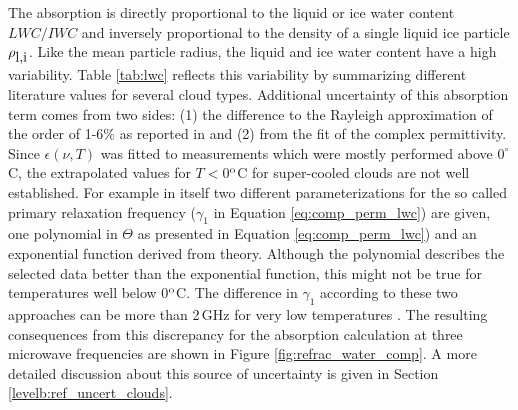 %
The absorption is directly proportional to the liquid or ice water
content $LWC/IWC$ and inversely proportional to the density of a
single liquid ice particle $\rho_{\mbox{\rm l,i}}$. Like the mean particle radius,
the liquid and ice water content have a high variability. Table
\ref{tab:lwc} reflects this variability by summarizing different
literature values for several cloud types. Additional uncertainty 
of this absorption term comes from two sides: 
(1) the difference to the Rayleigh approximation
of the order of 1-6\% as reported in \citet{lietal:97} and (2) from
the fit of the complex permittivity.  Since $\epsilon(\nu,T)$ was
fitted to measurements which were mostly performed above $0^\circ$C,
the extrapolated values for $T<$0$^{\rm o}$C for super-cooled
clouds are not well established. For example in \cite{liebeetal:91} 
itself two different parameterizations for the so called primary 
relaxation frequency ($\gamma_1$ in Equation \ref{eq:comp_perm_lwc}) 
are given, one polynomial in $\Theta$ as presented in 
Equation \ref{eq:comp_perm_lwc}) and an exponential function derived
from theory. Although the polynomial describes the selected 
data better than the exponential function, this might not be true for
temperatures well below 0$^{\rm o}$C.
The difference in $\gamma_1$ according to these two approaches can 
be more than 2\,GHz for very low temperatures \citep{liptonetal:99}. 
The resulting consequences from this discrepancy for the absorption 
calculation at three microwave frequencies are shown in 
Figure \ref{fig:refrac_water_comp}. A more detailed
discussion about this source of uncertainty is given in Section
\ref{levelb:ref_uncert_clouds}.
%
